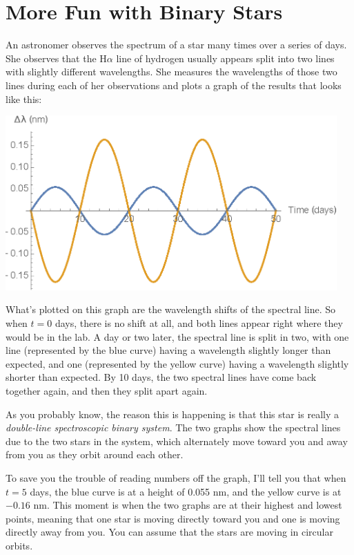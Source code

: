 \chapter{More Fun with Binary Stars}

An astronomer observes the spectrum of a star many times over a series of days.
She observes that the H$\alpha$ line of hydrogen usually appears split
into two lines with slightly different wavelengths. She measures
the wavelengths of those two lines during each of her observations
and plots a graph of the results that looks like this:

\centerline{\includegraphics[width=5in]{figs/binary1.eps}}

What's plotted on this graph are the wavelength shifts of the spectral line.
So when $t=0$ days, there is no shift at all, and both lines appear right
where they would be in the lab. A day or two later, the spectral line is split
in two, with one line (represented by the blue curve) having a wavelength slightly longer than expected, and one (represented by the yellow curve)
having a wavelength slightly shorter than expected. By 10 days, the two
spectral lines have come back together again, and then they split apart again.

As you probably know, the reason this is happening is that this star
is really a \textit{double-line spectroscopic binary system}. The two graphs
show the spectral lines due to the two stars in the system, which alternately
move toward you and away from you as they orbit around each other.

To save you the trouble of reading numbers off the graph, I'll
tell you that when $t=5$ days, the blue curve is at a height of 0.055 nm,
and the yellow curve is at $-0.16$ nm. This moment is when the two graphs
are at their highest and lowest points, meaning that one star is
moving directly toward you and one is moving directly away from you.
You can assume that the stars are moving in circular orbits.


